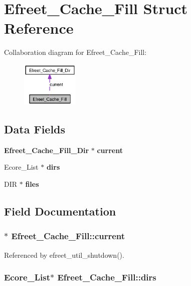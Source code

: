 \section{Efreet\_\-Cache\_\-Fill Struct Reference}
\label{structEfreet__Cache__Fill}
Collaboration diagram for Efreet\_\-Cache\_\-Fill:\nopagebreak
\begin{figure}[H]
\begin{center}
\leavevmode
\includegraphics[width=77pt]{structEfreet__Cache__Fill__coll__graph}
\end{center}
\end{figure}
\subsection*{Data Fields}
\begin{CompactItemize}
\item 
{\bf Efreet\_\-Cache\_\-Fill\_\-Dir} $\ast$ {\bf current}
\item 
Ecore\_\-List $\ast$ {\bf dirs}
\item 
DIR $\ast$ {\bf files}
\end{CompactItemize}


\subsection{Field Documentation}
\subsubsection{$\ast$ {\bf Efreet\_\-Cache\_\-Fill::current}}\label{structEfreet__Cache__Fill_b3e5d76e1aeef11b21965616c16c7d97}




Referenced by efreet\_\-util\_\-shutdown().
\subsubsection{\setlength{\rightskip}{0pt plus 5cm}Ecore\_\-List$\ast$ {\bf Efreet\_\-Cache\_\-Fill::dirs}}\label{structEfreet__Cache__Fill_7d762b5578ea695bf82aae406d08945d}




